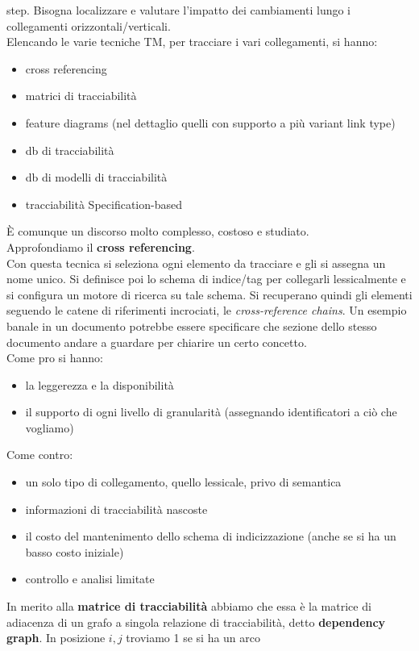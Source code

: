 \documentclass[a4paper,12pt, oneside]{book}
\begin{document}
step. Bisogna localizzare e valutare l'impatto dei cambiamenti lungo i 
collegamenti orizzontali/verticali. \\
Elencando le varie tecniche TM, per tracciare i vari collegamenti, si hanno:
\begin{itemize}
  \item cross referencing
  \item matrici di tracciabilità
  \item feature diagrams (nel dettaglio quelli con supporto a più variant link
  type) 
  \item db di tracciabilità
  \item db di modelli di tracciabilità
  \item tracciabilità Specification-based
\end{itemize}
È comunque un discorso molto complesso, costoso e studiato.\\
Approfondiamo il \textbf{cross referencing}.\\
Con questa tecnica si seleziona ogni elemento da tracciare e gli si assegna un
nome unico. Si definisce poi lo schema di indice/tag per collegarli
lessicalmente e si configura un motore di ricerca su tale schema. Si recuperano
quindi gli elementi seguendo le catene di riferimenti incrociati, le
\textit{cross-reference chains}. Un esempio banale in un documento potrebbe
essere specificare che sezione dello stesso documento andare a guardare per
chiarire un certo concetto.\\
Come pro si hanno:
\begin{itemize}
  \item la leggerezza e la disponibilità
  \item il supporto di ogni livello di granularità (assegnando identificatori a
  ciò che vogliamo)
\end{itemize}
Come contro:
\begin{itemize}
  \item un solo tipo di collegamento, quello lessicale, privo di semantica
  \item informazioni di tracciabilità nascoste
  \item il costo del mantenimento dello schema di indicizzazione (anche se si ha
  un basso costo iniziale)
  \item controllo e analisi limitate
\end{itemize}
In merito alla \textbf{matrice di tracciabilità} abbiamo che essa è la matrice
di adiacenza di un grafo a singola relazione di tracciabilità, detto
\textbf{dependency graph}. In posizione $i,j$ troviamo 1 se si ha un arco
\end{document}

